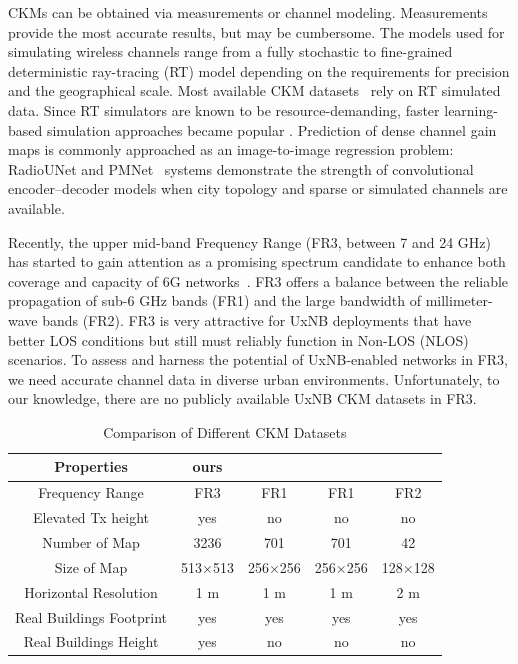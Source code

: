 \documentclass[10pt,conference,letterpaper]{IEEEtran}
\begin{document}
CKMs can be obtained via measurements or channel modeling. Measurements provide the most accurate results, but may be cumbersome. The models used for simulating wireless channels range from a fully stochastic to fine-grained deterministic ray-tracing (RT) model depending on the requirements for precision and the geographical scale. Most available CKM datasets~\cite{dataset2212,ckmimagenet2025} rely on RT simulated data. Since RT simulators are known to be resource-demanding, faster learning-based simulation approaches became popular \cite{Chen2017rem,radiounet2020,pmnet2023, pmnet_icassp2023}. Prediction of dense channel gain maps is commonly approached as an image-to-image regression problem: RadioUNet\cite{radiounet2020} and PMNet~\cite{pmnet2023, pmnet_icassp2023} systems demonstrate the strength of convolutional encoder--decoder models when city topology and sparse or simulated channels are available. 

Recently, the upper mid-band Frequency Range (FR3, between 7 and 24 GHz) has started to gain attention as a promising spectrum candidate to enhance both coverage and capacity of 6G networks~\cite{Cui2024}. FR3 offers a balance between the reliable propagation of sub-6 GHz bands (FR1) and the large bandwidth of millimeter-wave bands (FR2). FR3 is very attractive for UxNB deployments that have better LOS conditions but still must reliably function in Non-LOS (NLOS) scenarios.  To assess and harness the potential of UxNB-enabled networks in FR3, we need accurate channel data in diverse urban environments. Unfortunately, to our knowledge, there are no publicly available UxNB CKM datasets in FR3.

\begin{table}[b]
\vspace{-15pt}
\centering
\caption{Comparison of Different CKM Datasets}
\vspace{-2pt}
\begin{tabular}{@{}c|c|c|c|c@{}}
\toprule
Properties  & ours & \cite{radiodiff2025}   &  \cite{dataset2212}  &  \cite{ckmimagenet2025}   \\ \hline 
Frequency Range & FR3 & FR1  & FR1 & FR2 \\ \hline 

Elevated Tx height & yes & no  & no & no \\ \hline 
 
Number of Map & 3236 & 701 & 701  & 42 \\ \hline 

Size of Map  & 513$\times$513& 256$\times$256  & 256$\times$256  & 128$\times$128  \\  \hline 

Horizontal Resolution & 1 m& 1 m           & 1 m      & 2 m         \\ \hline 

Real Buildings Footprint  & yes   & yes     & yes   &yes \\  \hline 

Real Buildings Height & yes & no & no     & no  \\ 
\bottomrule
\end{tabular}
\label{tab:datasets}
\end{table}
\end{document}

